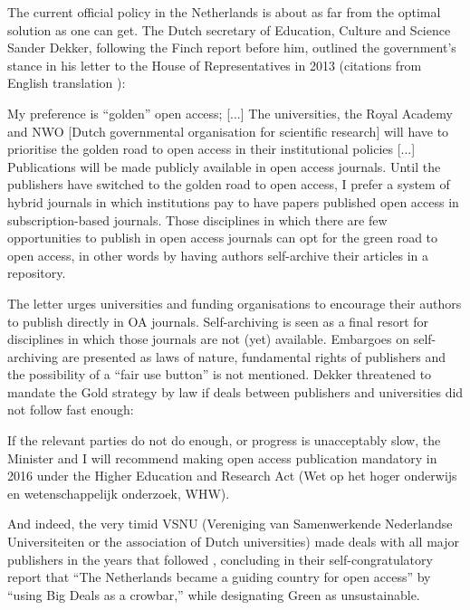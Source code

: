 \documentclass[11pt, openany, oneside, article, a4paper, twocolumn]{memoir}
\begin{document}
The current official policy in the Netherlands is about as far from the optimal
solution as one can get. The Dutch secretary of Education, Culture and Science
Sander Dekker, following the Finch report \cite{finch2012accessibility} before
him, outlined the government's stance in his letter to the House of
Representatives \cite{dekker_kamerbrief} in 2013 (citations from English
translation \cite{dekker_kamerbrief_english}):
\begin{displayquote}
\begin{small}
  My preference is “golden” open access; [...] The universities, the Royal
  Academy and NWO [Dutch governmental organisation for scientific
  research] will have to prioritise the golden road to open access in their
  institutional policies [...] Publications will be made publicly available in
  open access journals. Until the publishers have switched to the golden road
  to open access, I prefer a system of hybrid journals in which institutions
  pay to have papers published open access in subscription-based journals.
  Those disciplines in which there are few opportunities to publish in open
  access journals can opt for the green road to open access, in other words by
  having authors self-archive their articles in a repository.
\end{small}
\end{displayquote}

The letter urges universities and funding organisations to encourage their
authors to publish directly in OA journals. Self-archiving is seen as
a final resort for disciplines in which those journals are not (yet)
available. Embargoes on self-archiving are presented as laws of nature, fundamental rights
of publishers and the
possibility of a \enquote{fair use button} is not mentioned.
Dekker threatened to mandate the
Gold strategy by law if deals between publishers and universities did not follow
fast enough:
\begin{displayquote}
\begin{small}
If the relevant parties do not do enough, or progress is unacceptably slow, the
Minister and I will recommend making open access publication mandatory in 2016
under the Higher Education and Research Act (Wet op het hoger onderwijs en
wetenschappelijk onderzoek, WHW).
\end{small}
\end{displayquote}

And indeed, the very timid VSNU (Vereniging van Samenwerkende Nederlandse
Universiteiten or the association of Dutch universities) made deals with
all major publishers in the years that followed \cite{timeline_oa},
concluding in their self-congratulatory report \cite{ezine_oa} that \enquote{The Netherlands became a guiding country for open
access} by \enquote{using Big Deals as a crowbar,} while designating Green as unsustainable.
\end{document}
